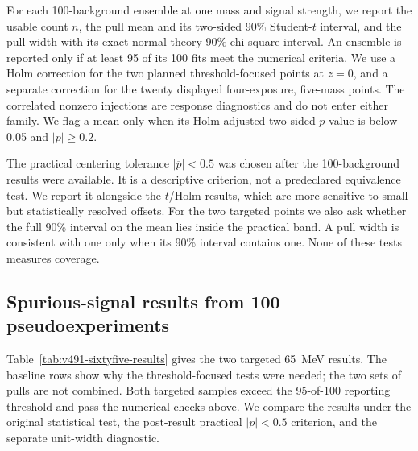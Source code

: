 For each 100-background ensemble at one mass and signal strength, we report the usable
count $n$, the pull mean and its two-sided 90\% Student-$t$ interval, and the pull width
with its exact normal-theory 90\% chi-square interval. An ensemble is reported only if
at least 95 of its 100 fits meet the numerical criteria. We use a Holm correction for
the two planned threshold-focused points at $z=0$, and a separate correction for the
twenty displayed four-exposure, five-mass points. The correlated nonzero injections are
response diagnostics and do not enter either family. We flag a mean only when its
Holm-adjusted two-sided $p$ value is below 0.05 and $|\overline p|\geq0.2$.

The practical centering tolerance $|\overline p|<0.5$ was chosen after the
100-background results were available. It is a descriptive criterion, not a
predeclared equivalence test. We report it alongside the $t$/Holm results, which are
more sensitive to small but statistically resolved offsets. For the two targeted
points we also ask whether the full 90\% interval on the mean lies inside the practical
band. A pull width is consistent with one only when its 90\% interval contains one.
None of these tests measures \CLs{} coverage.

\subsection{Spurious-signal results from 100 pseudoexperiments}
\label{sec:v491-spurious-signal}

Table~\ref{tab:v491-sixtyfive-results} gives the two targeted 65~MeV results. The
baseline rows show why the threshold-focused tests were needed; the two sets of pulls
are not combined. Both targeted samples exceed the 95-of-100 reporting
threshold and pass the numerical checks above.  We compare the results under the
original statistical test, the post-result practical
$|\overline p|<0.5$ criterion, and the separate unit-width diagnostic.

